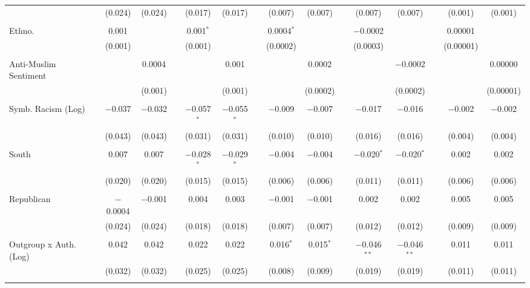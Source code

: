 \begin{table}[H]
{\begin{tabular}{@{\extracolsep{5pt}}lccccccccccccccc}
  &  & (0.024) & (0.024) &  & (0.017) & (0.017) &  & (0.007) & (0.007) &  & (0.007) & (0.007) &  & (0.001) & (0.001) \\ 
  & & & & & & & & & & & & & & & \\ 
 Ethno. &  & 0.001 &  &  & 0.001$^{*}$ &  &  & 0.0004$^{*}$ &  &  & $-$0.0002 &  &  & 0.00001 &  \\ 
  &  & (0.001) &  &  & (0.001) &  &  & (0.0002) &  &  & (0.0003) &  &  & (0.00001) &  \\ 
  & & & & & & & & & & & & & & & \\ 
 Anti-Muslim Sentiment &  &  & 0.0004 &  &  & 0.001 &  &  & 0.0002 &  &  & $-$0.0002 &  &  & 0.00000 \\ 
  &  &  & (0.001) &  &  & (0.001) &  &  & (0.0002) &  &  & (0.0002) &  &  & (0.00001) \\ 
  & & & & & & & & & & & & & & & \\ 
 Symb. Racism (Log) &  & $-$0.037 & $-$0.032 &  & $-$0.057$^{*}$ & $-$0.055$^{*}$ &  & $-$0.009 & $-$0.007 &  & $-$0.017 & $-$0.016 &  & $-$0.002 & $-$0.002 \\ 
  &  & (0.043) & (0.043) &  & (0.031) & (0.031) &  & (0.010) & (0.010) &  & (0.016) & (0.016) &  & (0.004) & (0.004) \\ 
  & & & & & & & & & & & & & & & \\ 
 South &  & 0.007 & 0.007 &  & $-$0.028$^{*}$ & $-$0.029$^{*}$ &  & $-$0.004 & $-$0.004 &  & $-$0.020$^{*}$ & $-$0.020$^{*}$ &  & 0.002 & 0.002 \\ 
  &  & (0.020) & (0.020) &  & (0.015) & (0.015) &  & (0.006) & (0.006) &  & (0.011) & (0.011) &  & (0.006) & (0.006) \\ 
  & & & & & & & & & & & & & & & \\ 
 Republican &  & $-$0.0004 & $-$0.001 &  & 0.004 & 0.003 &  & $-$0.001 & $-$0.001 &  & 0.002 & 0.002 &  & 0.005 & 0.005 \\ 
  &  & (0.024) & (0.024) &  & (0.018) & (0.018) &  & (0.007) & (0.007) &  & (0.012) & (0.012) &  & (0.009) & (0.009) \\ 
  & & & & & & & & & & & & & & & \\ 
 Outgroup x Auth. (Log) &  & 0.042 & 0.042 &  & 0.022 & 0.022 &  & 0.016$^{*}$ & 0.015$^{*}$ &  & $-$0.046$^{**}$ & $-$0.046$^{**}$ &  & 0.011 & 0.011 \\ 
  &  & (0.032) & (0.032) &  & (0.025) & (0.025) &  & (0.008) & (0.009) &  & (0.019) & (0.019) &  & (0.011) & (0.011) \\ 
  & & & & & & & & & & & & & & & \\ 

\end{tabular}}
\end{table}
